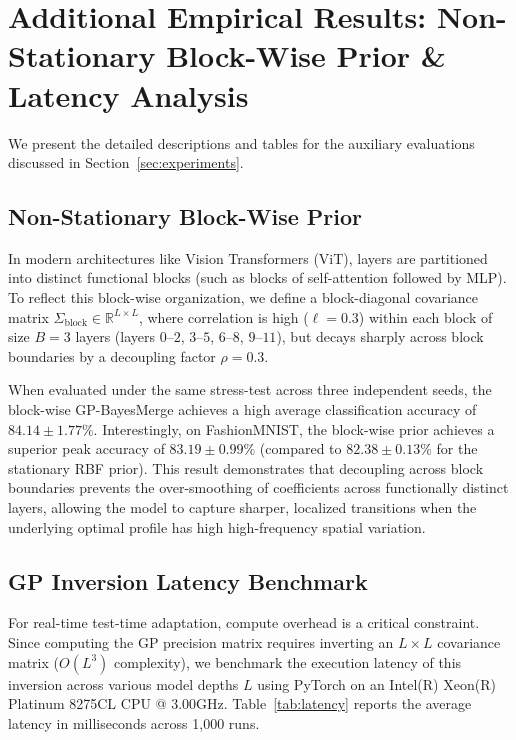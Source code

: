 \documentclass{article}
\theoremstyle{plain}
\theoremstyle{definition}
\theoremstyle{remark}
\begin{document}
\section{Additional Empirical Results: Non-Stationary Block-Wise Prior \& Latency Analysis}
\label{sec:appendix_experiments}

We present the detailed descriptions and tables for the auxiliary evaluations discussed in Section~\ref{sec:experiments}.

\subsection{Non-Stationary Block-Wise Prior}
\label{subsec:appendix_block_prior}

In modern architectures like Vision Transformers (ViT), layers are partitioned into distinct functional blocks (such as blocks of self-attention followed by MLP). To reflect this block-wise organization, we define a block-diagonal covariance matrix $\Sigma_{\text{block}} \in \mathbb{R}^{L \times L}$, where correlation is high ($\ell = 0.3$) within each block of size $B=3$ layers (layers $0$--$2$, $3$--$5$, $6$--$8$, $9$--$11$), but decays sharply across block boundaries by a decoupling factor $\rho = 0.3$. 

When evaluated under the same stress-test across three independent seeds, the block-wise GP-BayesMerge achieves a high average classification accuracy of $84.14 \pm 1.77\%$. Interestingly, on FashionMNIST, the block-wise prior achieves a superior peak accuracy of $83.19 \pm 0.99\%$ (compared to $82.38 \pm 0.13\%$ for the stationary RBF prior). This result demonstrates that decoupling across block boundaries prevents the over-smoothing of coefficients across functionally distinct layers, allowing the model to capture sharper, localized transitions when the underlying optimal profile has high high-frequency spatial variation.

\subsection{GP Inversion Latency Benchmark}
\label{subsec:appendix_latency}

For real-time test-time adaptation, compute overhead is a critical constraint. Since computing the GP precision matrix requires inverting an $L \times L$ covariance matrix ($O(L^3)$ complexity), we benchmark the execution latency of this inversion across various model depths $L$ using PyTorch on an Intel(R) Xeon(R) Platinum 8275CL CPU @ 3.00GHz. Table~\ref{tab:latency} reports the average latency in milliseconds across 1,000 runs.
\end{document}
